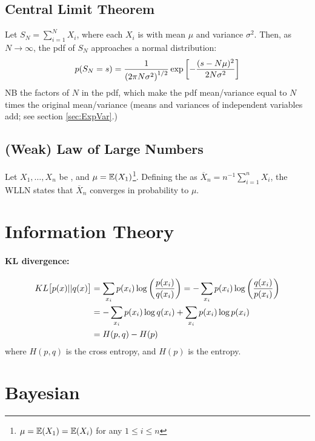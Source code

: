 \documentclass[11pt]{article}
\begin{document}
\subsection{Central Limit Theorem}
Let $S_N = \sum_{i=1}^N X_i$, where each $X_i$ is  with mean $\mu$ and variance
$\sigma^2$. Then, as $N \to \infty$, the pdf of $S_N$ approaches a normal distribution:
\begin{equation}
  p(S_N = s) = \frac{1}{\left( 2 \pi N \sigma^2 \right)^{1/2}} \exp \left[ - \frac{(s - N
    \mu)^2}{2 N \sigma^2} \right] 
\end{equation}
NB the factors of $N$ in the pdf, which make the pdf mean/variance equal to $N$ times
the original mean/variance (\eie means and variances of independent variables add; see
section \ref{sec:ExpVar}.)


\subsection{(Weak) Law of Large Numbers}
Let $X_1, \dots, X_n$ be , and $\mu = \mathbb{E}(X_1)$\footnote{$\mu = \mathbb{E}(X_1) =
  \mathbb{E}(X_i)$ for any $1 \leq i \leq n$}. Defining the  as
$\overline{X}_n = n^{-1} \sum_{i=1}^n X_i$, the WLLN states that $\overline{X}_n$
converges in probability to $\mu$. 



\section{Information Theory}
\paragraph{KL divergence:}
\begin{align}
  KL\big[p(x) || q(x)\big]
  &= \sum_{x_i} p(x_i) \log \left( \frac{p(x_i)}{q(x_i)} \right)
    = -\sum_{x_i} p(x_i) \log \left( \frac{q(x_i)}{p(x_i)} \right) \nonumber\\ 
  &= -\sum_{x_i} p(x_i) \log q(x_i) + \sum_{x_i} p(x_i) \log p(x_i) \nonumber\\ 
  &= H(p,q) - H(p)
\end{align}
where $H(p,q)$ is the cross entropy, and $H(p)$ is the entropy.



\section{Bayesian}
\end{document}
